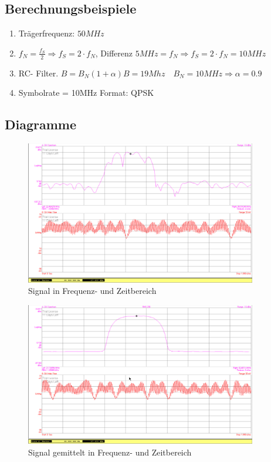 \documentclass[12pt,a4paper,ngerman]{article}
\begin{document}
\subsection{Berechnungsbeispiele}
\begin{enumerate}
\item Trägerfrequenz: $50MHz$
\item $f_N = \frac{f_S}{2} \Rightarrow f_S = 2 \cdot f_N$, Differenz $5 MHz = f_N \Rightarrow f_S = 2 \cdot f_N = 10 MHz$
\item RC- Filter. $B = B_N (1 + \alpha) B = 19Mhz \quad B_N = 10 MHz \Rightarrow \alpha = 0.9$
\item Symbolrate = 10MHz Format: QPSK
\end{enumerate}
\pagebreak
\subsection{Diagramme}
\begin{figure}[H]
\centering
\includegraphics[width=0.9\textwidth]{figures/Aufgabe1_QPSK.jpg} 
\caption{Signal in Frequenz- und Zeitbereich}
\label{fig:1_sig}
\end{figure}


\begin{figure}[H]
\centering
\includegraphics[width=0.9\textwidth]{figures/Aufgabe1_QPSK_avg.jpg} 
\caption{Signal gemittelt in Frequenz- und Zeitbereich}
\label{fig:1_sig_avg}
\end{figure}
\end{document}
